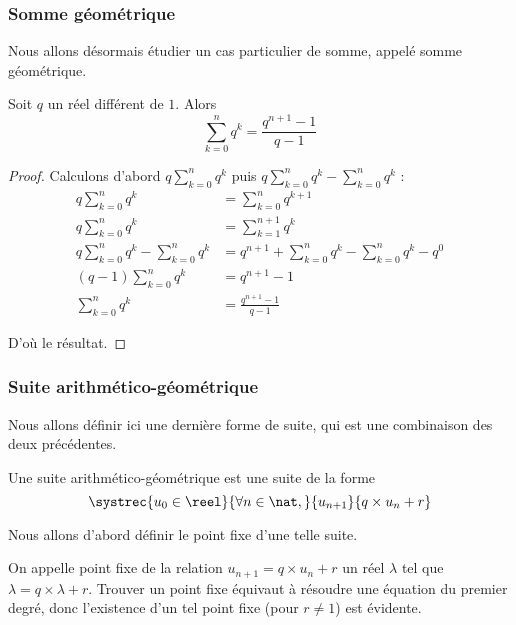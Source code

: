 \subsubsection{Somme géométrique}

Nous allons désormais étudier un cas particulier de somme, appelé somme géométrique.

\begin{prop}
    Soit $q$ un réel différent de $1$. Alors $$\sum_{k=0}^n q^k=\frac{q^{n+1}-1}{q-1}$$
\end{prop}
\begin{proof}
    Calculons d'abord $\displaystyle{q\sum_{k=0}^n q^k}$ puis $\displaystyle{q \sum_{k=0}^n q^k - \sum_{k=0}^n q^k}$ :
    \begin{align*}
        q \sum_{k=0}^n q^k &= \sum_{k=0}^n q^{k+1}\\
        q \sum_{k=0}^n q^k &= \sum_{k=1}^{n+1} q^k\\
        q \sum_{k=0}^n q^k - \sum_{k=0}^n q^k &= q^{n+1} + \sum_{k=0}^n q^k - \sum_{k=0}^n q^k - q^0\\
        (q-1) \sum_{k=0}^n q^k &= q^{n+1}-1\\
        \sum_{k=0}^n q^k &= \frac{q^{n+1}-1}{q-1}
    \end{align*}
    
    D'où le résultat.
\end{proof}

\subsubsection{Suite arithmético-géométrique}

Nous allons définir ici une dernière forme de suite, qui est une combinaison des deux précédentes.

\begin{defi}
    Une suite arithmético-géométrique est une suite de la forme $$\systrec{u_0\in\reel}{\forall n\in\nat,}{u_{n+1}}{q\times u_n + r}$$
\end{defi}

Nous allons d'abord définir le point fixe d'une telle suite.

\begin{defi}
    On appelle point fixe de la relation $u_{n+1}=q\times u_n + r$ un réel $\lambda$ tel que $\lambda = q\times \lambda + r$. Trouver un point fixe équivaut à résoudre une équation du premier degré, donc l'existence d'un tel point fixe (pour $r\neq 1$) est évidente.
\end{defi}


